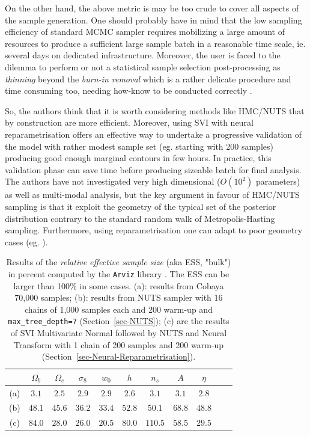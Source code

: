 \documentclass[twocolumn,twocolappendix,nofootinbib,iop]{openjournal}
\begin{document}
On the other hand, the above metric is may be too crude to cover all aspects of the sample generation. One should probably have in mind that the low sampling efficiency of standard MCMC sampler requires mobilizing a large amount of resources to produce a sufficient large sample batch in a reasonable time scale, ie. several days on dedicated infrastructure. Moreover, the user is faced to the dilemma to perform or not a statistical sample selection post-processing as \textit{thinning} beyond the \textit{burn-in removal} which is a rather delicate procedure and time consuming too, needing how-know to be conducted correctly \citep{doi:10.1146/annurev-statistics-040220-091727, 2015arXiv151007727O}. 

So, the authors think that it is worth considering methods like HMC/NUTS that by construction are more efficient. Moreover, using SVI with neural reparametrisation offers an effective way to undertake a progressive validation of the model with rather modest sample set (eg. starting with 200 samples) producing good enough marginal contours in few hours. In practice, this validation phase can save time before producing sizeable batch for final analysis. The authors have not investigated very high dimensional ($O(10^2)$ parameters) as well as multi-modal analysis, but the key argument in favour of HMC/NUTS sampling is that it exploit the geometry of the typical set of the posterior distribution contrary to the standard random walk of Metropolis-Hasting sampling. Furthermore, using reparametrisation  one can adapt to poor geometry cases (eg. \cite{2019arXiv190303704H}).
%
\begin{table}[htb]
\caption{Results of the \textit{relative effective sample size} (aka ESS, "bulk") in percent computed by the \texttt{Arviz} library \citep{arviz_2019}. The ESS can be larger than 100\% in some cases. 
(a): results from Cobaya 70,000 samples;
(b): results from NUTS sampler with 16 chains of 1,000 samples each and 200 warm-up and \texttt{max\_tree\_depth=7} (Section~\ref{sec-NUTS}); 
(c) are the results of SVI Multivariate Normal followed by NUTS and Neural Transform  with 1 chain of 200 samples and 200 warm-up (Section~\ref{sec-Neural-Reparametrisation}).}
\label{tab-ESS-NUTS_SVI-1}
 \centering
\begin{tabular}{ccccccccccc}
\hline
    & $\Omega_b$ & $\Omega_c$ & $\sigma_8$ & $w_0$ & $h$ & $n_s$ & $A$ & $\eta$\\
\hline
(a) &  $3.1$ & $2.5$       & $2.9$      & $2.9$  & $2.6$  & $3.1$  & $3.1$ & $2.8$ \\  
(b) & $48.1$ &  $45.6$     & $36.2$     & $33.4$ & $52.8$ & $50.1$ & $68.8$ & $48.8$\\
(c) & $84.0$ &  $28.0$     & $26.0$     & $20.5$ & $80.0$ & $110.5$ & $58.5$ & $29.5$\\
\hline
\end{tabular}
\end{table}
\end{document}
